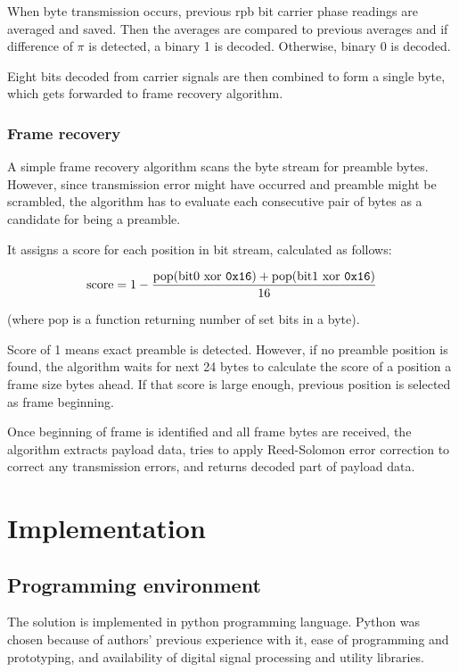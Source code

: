 \documentclass[english,bachelor,a4paper,oneside]{ppfcmthesis}
\begin{document}
When byte transmission occurs, previous rpb bit carrier phase readings are averaged and saved. Then the averages are compared to previous averages and if difference of $\pi$ is detected, a binary 1 is decoded. Otherwise, binary 0 is decoded.

Eight bits decoded from carrier signals are then combined to form a single byte, which gets forwarded to frame recovery algorithm.

\subsection{Frame recovery}
\label{sec:frame-recovery}

A simple frame recovery algorithm scans the byte stream for preamble bytes.
However, since transmission error might have occurred and preamble might be scrambled, the algorithm has to evaluate each consecutive pair of bytes as a candidate for being a preamble.

It assigns a score for each position in bit stream, calculated as follows:

\begin{equation}
\textrm{score} = 1 - \frac{\textrm{pop(bit0 xor \texttt{0x16})} + \textrm{pop(bit1 xor \texttt{0x16})}}{16}
\end{equation}

(where pop is a function returning number of set bits in a byte).

Score of 1 means exact preamble is detected. However, if no preamble position is found, the algorithm waits for next 24 bytes to calculate the score of a position a frame size bytes ahead. If that score is large enough, previous position is selected as frame beginning.

Once beginning of frame is identified and all frame bytes are received, the algorithm extracts payload data, tries to apply Reed-Solomon error correction to correct any transmission errors, and returns decoded part of payload data.

\chapter{Implementation}

\section{Programming environment}

The solution is implemented in python programming language. Python was chosen because of authors' previous experience with it, ease of programming and prototyping, and availability of digital signal processing and utility libraries.
\end{document}

